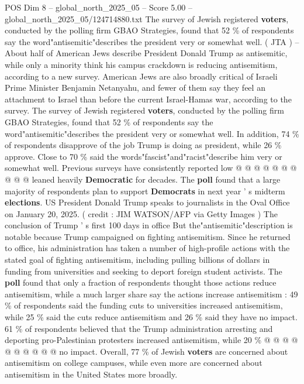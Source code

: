 \begin{textsample}{POS Dim 8 – global\_north\_2025\_05 – Score 5.00 – global\_north\_2025\_05/124714880.txt}  \label{ex:f8_pos_407}
The survey of Jewish registered \textbf{voters}, conducted by the polling firm GBAO Strategies, found that 52 \% of respondents say the word"antisemitic"describes the president very or somewhat well. ( JTA ) -- About half of American Jews describe President Donald Trump as antisemitic, while only a minority think his campus crackdown is reducing antisemitism, according to a new survey.
American Jews are also broadly critical of Israeli Prime Minister Benjamin Netanyahu, and fewer of them say they feel an attachment to Israel than before the current Israel-Hamas war, according to the survey.
The survey of Jewish registered \textbf{voters}, conducted by the polling firm GBAO Strategies, found that 52 \% of respondents say the word"antisemitic"describes the president very or somewhat well.
In addition, 74 \% of respondents disapprove of the job Trump is doing as president, while 26 \% approve.
Close to 70 \% said the words"fascist"and"racist"describe him very or somewhat well.
Previous surveys have consistently reported low @ @ @ @ @ @ @ @ @ @ leaned heavily \textbf{Democratic} for decades.
The \textbf{poll} found that a large majority of respondents plan to support \textbf{Democrats} in next year ' s midterm \textbf{elections}.
US President Donald Trump speaks to journalists in the Oval Office on January 20, 2025. ( credit : JIM WATSON/AFP via Getty Images ) The conclusion of Trump ' s first 100 days in office But the"antisemitic"description is notable because Trump campaigned on fighting antisemitism.
Since he returned to office, his administration has taken a number of high-profile actions with the stated goal of fighting antisemitism, including pulling billions of dollars in funding from universities and seeking to deport foreign student activists.
The \textbf{poll} found that only a fraction of respondents thought those actions reduce antisemitism, while a much larger share say the actions increase antisemitism : 49 \% of respondents said the funding cuts to universities increased antisemitism, while 25 \% said the cuts reduce antisemitism and 26 \% said they have no impact. 61 \% of respondents believed that the Trump administration arresting and deporting pro-Palestinian protesters increased antisemitism, while 20 \% @ @ @ @ @ @ @ @ @ @ no impact.
Overall, 77 \% of Jewish \textbf{voters} are concerned about antisemitism on college campuses, while even more are concerned about antisemitism in the United States more broadly.

\end{textsample}
